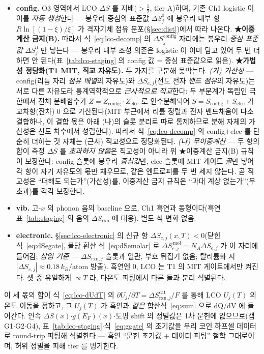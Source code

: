 \documentclass[11pt,a4paper]{article}
\newcommand{\rxn}{\mathrm{rxn}}
\begin{document}
\begin{itemize}[leftmargin=1.4em,itemsep=2pt]
\item \textbf{config.} O3 영역에서 LCO $\Delta S$ 를 지배($>\tfrac12$\cite{reynier2004}, tier A)하며, 기존 Ch1 logistic 이 이를
\emph{자동 생성}한다 — 봉우리 중심의 표준값 $\Delta S_j^0$ 에 봉우리 내부 항 $R\ln[(1-\xi)/\xi]$ 가 격자기체
점유 분포(\S\ref{sec:dist})에서 따라 나온다. \textbf{★이중계산 금지(B).} 따라서 식~\eqref{eq:lco-decomp} 의
$\Delta S_j^\mathrm{config}$ 자리에는 봉우리 \emph{중심 표준값} $\Delta S_j^0$ 만 넣는다 — 봉우리 내부 조성 의존은
logistic 이 이미 담고 있어 두 번 더하면 안 된다(표~\ref{tab:lco-staging} 의 config 값 = 중심 표준값으로 읽음).
\textbf{★가법성 정당화(T1 MIT, 직교 자유도).} 두 가지를 구분해 못박는다. \emph{(가) 가산성} — config(리튬 자리
\emph{점유 배열}의 자유도)와 $\Delta S_{e,j}$(전도 전자 \emph{밴드 점유}의 자유도)는 서로 다른 자유도라 통계역학적으로
\emph{근사적으로 직교}한다: 두 부분계가 독립인 극한에서 전체 분배함수가 $Z=Z_\mathrm{config}\!\cdot\!Z_\mathrm{elec}$ 로
인수분해되어 $S=S_\mathrm{config}+S_\mathrm{elec}$ 가 교차항(잔차) $0$ 으로 가산된다(MIT 부근에서 리튬 정렬과 전자
밴드채움이 다소 결합하나, 이 결합 몫은 아래 (나)의 슬롯 분리로 따로 통제하므로 분해 자체의 가산성은 선도 차수에서
성립한다). 따라서 식~\eqref{eq:lco-decomp} 의 config$+$elec 를 단순히 더하는 것 자체는 (근사) 직교성으로 정당화된다. \emph{(나) 무이중계산} — 두 항의 합이 측정
$\Delta S$ 를 \emph{초과하지 않음}은 직교성이 아니라 위 ★이중계산 금지(B) 규칙이 보장한다: config 슬롯에 봉우리
\emph{중심값}만, elec 슬롯에 MIT 게이트 \emph{골}만 넣어 각 항이 자기 자유도의 몫만 채우므로, 같은 엔트로피를 두 번
세지 않는다. 곧 직교성은 ``더해도 되는가''(가산성)를, 이중계산 금지 규칙은 ``과대 계상 없는가''(무초과)를 각각 보장한다.
\item \textbf{vib.} 고-$x$ 의 phonon 음의 baseline 으로, Ch1 흑연과 동형이다(흑연 표~\ref{tab:staging} 의 음의
$\Delta S_\rxn$ 에 대응). 별도 식 변화 없음.
\item \textbf{electronic.} \S\ref{sec:lco-electronic} 의 신규 항 $\Delta S_{e,j}(x,T)<0$(닫힌식~\eqref{eq:dSegate},
몰당 환산 식~\eqref{eq:dSemolar} 로 $\Delta S_{e,j}^{\,\mathrm{mol}}=N_A\Delta S_{e,j}$ 가 이 자리에 들어감; \emph{삽입
기준} — $\Delta S_{\rxn,j}$ 슬롯과 일관, 부호 뒤집기 없음; 탈리튬화 시 $|\Delta S_{e,j}|\approx0.18\,k_B$/atom 방출).
흑연엔 0, LCO 는 T1 의 MIT 게이트에서만 켜진다. 셋 중 유일하게 $\propto T$ 라, 다온도 피팅에서 다른 둘과 분리 식별된다.
\end{itemize}
이 세 몫의 합이 식~\eqref{eq:lco-dUdT} 의 $\partial U_j/\partial T=\Delta S_{\rxn,j}^\mathrm{cat}/F$ 를 통해 LCO
$U_j(T)$ 의 온도 이동을 정하고, 그 $U_j(T)$ 가 흑연과 \emph{같은} 합산식~\eqref{eq:sum} 으로 dQ/dV 에 들어간다.
연속 $\Delta S(x)$$\cdot$$g(E_F)(x)$$\cdot$도핑 shift 의 정밀값은 1차 문헌에 없으므로(갭 G1$\cdot$G2$\cdot$G4),
표~\ref{tab:lco-staging}$\cdot$식~\eqref{eq:ggate} 의 초기값을 우리 코인 하프셀 데이터로 round-trip 피팅해 식별한다
— 흑연 ``문헌 초기값 + 데이터 피팅'' 철학 그대로이며, 허위 정밀을 피해 tier 를 병기한다.
\end{document}
